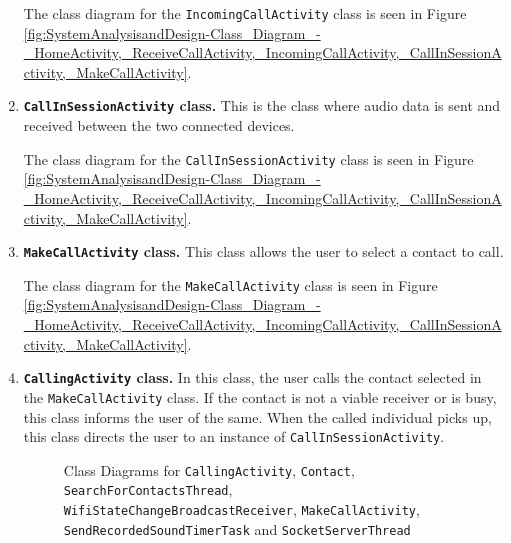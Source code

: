 \documentclass[12pt,svgnames,smaller]{article} %
\begin{document}
\begin{enumerate}
		The class diagram for the \texttt{IncomingCallActivity} class is seen in Figure \ref{fig:SystemAnalysisandDesign-Class_Diagram_-_HomeActivity,_ReceiveCallActivity,_IncomingCallActivity,_CallInSessionActivity,_MakeCallActivity}.
		
		\item \textbf{\texttt{CallInSessionActivity} class.} This is the class where audio data is sent and received between the two connected devices.

		The class diagram for the \texttt{CallInSessionActivity} class is seen in Figure \ref{fig:SystemAnalysisandDesign-Class_Diagram_-_HomeActivity,_ReceiveCallActivity,_IncomingCallActivity,_CallInSessionActivity,_MakeCallActivity}.
		
		\item \textbf{\texttt{MakeCallActivity} class.} This class allows the user to select a contact to call.

		The class diagram for the \texttt{MakeCallActivity} class is seen in Figure \ref{fig:SystemAnalysisandDesign-Class_Diagram_-_HomeActivity,_ReceiveCallActivity,_IncomingCallActivity,_CallInSessionActivity,_MakeCallActivity}.
		
		\item \textbf{\texttt{CallingActivity} class.} In this class, the user calls the contact selected in the \texttt{MakeCallActivity} class. If the contact is not a viable receiver or is busy, this class informs the user of the same. When the called individual picks up, this class directs the user to an instance of \texttt{CallInSessionActivity}.

		\begin{figure}
			\caption{Class Diagrams for \texttt{CallingActivity}, \texttt{Contact}, \texttt{SearchForContactsThread}, \texttt{WifiStateChangeBroadcastReceiver}, \texttt{MakeCallActivity}, \texttt{SendRecordedSoundTimerTask} and \texttt{SocketServerThread}}			\label{fig:SystemAnalysisandDesign-Class_Diagram_-_CallingActivity,_Contact,_SearchForContactsThread,_WifiStateChangeBroadcastReceiver,_SendRecordedSoundTimerTask,_SocketServerThread}
		\end{figure}


\end{enumerate}
\end{document}

